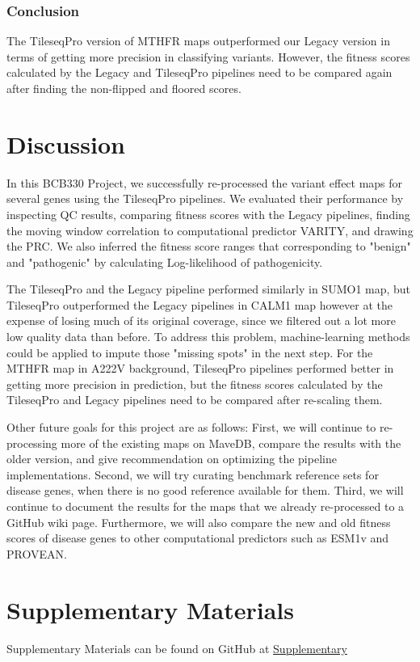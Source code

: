 \documentclass{article}
\begin{document}
\subsubsection{Conclusion}
The TileseqPro version of MTHFR maps outperformed our Legacy version in terms of getting more precision in classifying variants. However, the fitness scores calculated by the Legacy and TileseqPro pipelines need to be compared again after finding the non-flipped and floored scores. 




\newpage
\section{Discussion}
In this BCB330 Project, we successfully re-processed the variant effect maps for several genes using the TileseqPro pipelines. We evaluated their performance by inspecting QC results, comparing fitness scores with the Legacy pipelines, finding the moving window correlation to computational predictor VARITY, and drawing the PRC. We also inferred the fitness score ranges that corresponding to "benign" and "pathogenic" by calculating Log-likelihood of pathogenicity. 

The TileseqPro and the Legacy pipeline performed similarly in SUMO1 map, but TileseqPro outperformed the Legacy pipelines in CALM1 map however at the expense of losing much of its original coverage, since we filtered out a lot more low quality data than before. To address this problem, machine-learning methods could be applied to impute those "missing spots" in the next step. For the MTHFR map in A222V background, TileseqPro pipelines performed better in getting more precision in prediction, but the fitness scores calculated by the TileseqPro and Legacy pipelines need to be compared after re-scaling them. 

Other future goals for this project are as follows: First, we will continue to re-processing more of the existing maps on MaveDB, compare the results with the older version, and give recommendation on optimizing the pipeline implementations. Second, we will try curating benchmark reference sets for disease genes, when there is no good reference available for them. Third, we will continue to document the results for the maps that we already re-processed
to a GitHub wiki page. Furthermore, we will also compare the new and old fitness scores of disease genes to other computational predictors such as ESM1v\cite{lin2023evolutionary} and PROVEAN\cite{sandell_fitness_2022}.


\section{Supplementary Materials}
Supplementary Materials can be found on GitHub at \href{https://github.com/Bilin22/BCB330-Final-Report/blob/main/output/Supplementary.pdf}{Supplementary}




\end{document}
